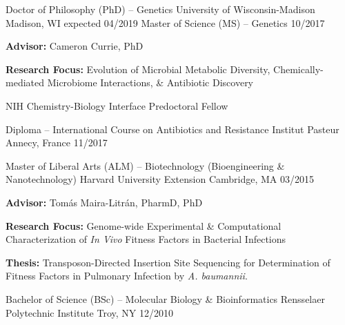{}

\begin{cventries}
\cventry
	{Doctor of Philosophy (PhD) -- Genetics}
	{University of Wisconsin-Madison}
	{Madison, WI}
	{expected 04/2019}
	{}
	\vspace{-0.4cm}
\cventry
	{Master of Science (MS) -- Genetics}
	{}
	{}
	{10/2017}
	{
      \begin{cvitems}
      	\item {\textbf{Advisor:} Cameron Currie, PhD}
      	\item {\textbf{Research Focus:} Evolution of Microbial Metabolic Diversity, Chemically-mediated Microbiome Interactions, \& Antibiotic Discovery}
      	\item {NIH Chemistry-Biology Interface Predoctoral Fellow}
      \end{cvitems}
    }
    
\cventry
	{Diploma -- International Course on Antibiotics and Resistance}
	{Institut Pasteur}
	{Annecy, France}
	{11/2017}
	{} \vspace{-4mm}
    
\cventry
	{Master of Liberal Arts (ALM) -- Biotechnology (Bioengineering \& Nanotechnology)}
	{Harvard University Extension}
	{Cambridge, MA}
	{03/2015}
	{
      \begin{cvitems}
      	\item {\textbf{Advisor:} Tom\'{a}s Maira-Litr\'{a}n, PharmD, PhD}
      	\item {\textbf{Research Focus:} Genome-wide Experimental \& Computational Characterization of \textit{In Vivo} Fitness Factors in Bacterial Infections}
      	\item {\textbf{Thesis:} Transposon-Directed Insertion Site Sequencing for Determination of Fitness Factors in Pulmonary Infection by \textit{A. baumannii}.}
      \end{cvitems}
    }

\cventry
	{Bachelor of Science (BSc) -- Molecular Biology \& Bioinformatics}
	{Rensselaer Polytechnic Institute}
	{Troy, NY}
	{12/2010}
	{}
\end{cventries}

\vspace{-7mm}